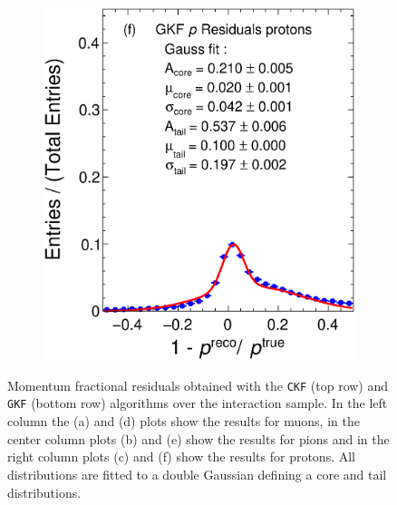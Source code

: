 \begin{figure}[t]
\begin{subfigure}{0.32\textwidth}
         \caption{}
         \label{fig:pResGKF211_Int}
     \end{subfigure}
          \begin{subfigure}{0.32\textwidth}
         \centering
         \includegraphics[width=\textwidth]{figures/ch5-KF_NDGAr/FullSample/Int/pRes/1D/RespGAr2212.eps}
         \caption{}
         \label{fig:pResGKF2212_Int}
     \end{subfigure}
        \caption[Momentum fractional residuals obtained with the \texttt{CKF} and \texttt{GKF} algorithms over the interaction sample.]{Momentum fractional residuals obtained with the \texttt{CKF} (top row) and \texttt{GKF} (bottom row) algorithms over the interaction sample. In the left column the (a) and (d) plots show the results for muons, in the center column plots (b) and (e) show the results for pions and in the right column plots (c) and (f) show the results for protons. All distributions are fitted to a double Gaussian defining a core and tail distributions.}
        \label{fig:pRes1D_Int}
\end{figure}

